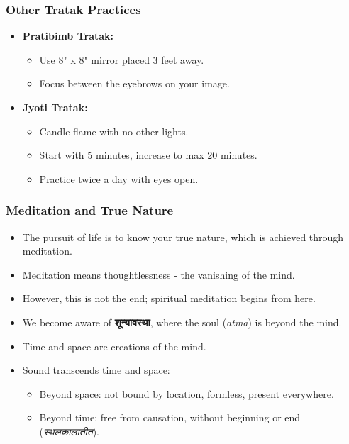 \begin{frame}[fragile]\frametitle{Other Tratak Practices}
    \begin{itemize}
        \item \textbf{Pratibimb Tratak:}
        \begin{itemize}
            \item Use 8" x 8" mirror placed 3 feet away.
            \item Focus between the eyebrows on your image.
        \end{itemize}
        \item \textbf{Jyoti Tratak:}
        \begin{itemize}
            \item Candle flame with no other lights.
            \item Start with 5 minutes, increase to max 20 minutes.
            \item Practice twice a day with eyes open.
        \end{itemize}
    \end{itemize}
\end{frame}


\begin{frame}[fragile]\frametitle{Meditation and True Nature}
      \begin{itemize}
        \item The pursuit of life is to know your true nature, which is achieved through meditation.
        \item Meditation means thoughtlessness - the vanishing of the mind.
        \item However, this is not the end; spiritual meditation begins from here.
        \item We become aware of \textbf{शून्यावस्था}, where the soul (\textit{atma}) is beyond the mind.
        \item Time and space are creations of the mind.
        \item Sound transcends time and space:
            \begin{itemize}
                \item Beyond space: not bound by location, formless, present everywhere.
                \item Beyond time: free from causation, without beginning or end (\textit{स्थलकालातीत}).
            \end{itemize}
      \end{itemize}
\end{frame}














